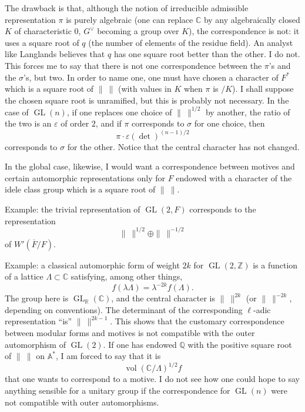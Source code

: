 \documentclass[11pt]{article}
\newcommand{\GL}{\operatorname{GL}}
\newcommand{\vol}{\operatorname{vol}}
\newcommand{\Fbar}{\overline F}
\newcommand{\normchar}{\|\ \|}
\begin{document}
The drawback is that, although the notion of irreducible admissible representation \(\pi\) is purely algebraic (one can replace \(\mathbb C\) by any algebraically closed \(K\) of characteristic \(0\), \(G^\vee\) becoming a group over \(K\)), the correspondence is not: it uses a square root of \(q\) (the number of elements of the residue field). An analyst like Langlands believes that \(q\) has one square root better than the other. I do not. This forces me to say that there is not one correspondence between the \(\pi\)'s and the \(\sigma\)'s, but two. In order to name one, one must have chosen a character of \(F^\ast\) which is a square root of \(\normchar\) (with values in \(K\) when \(\pi\) is \(/K\)). I shall suppose the chosen square root is unramified, but this is probably not necessary. In the case of \(\GL(n)\), if one replaces one choice of \(\normchar^{1/2}\) by another, the ratio of the two is an \(\varepsilon\) of order \(2\), and if \(\pi\) corresponds to \(\sigma\) for one choice, then
\[
\pi\cdot\varepsilon(\det)^{(n-1)/2}
\]
corresponds to \(\sigma\) for the other. Notice that the central character has not changed.

In the global case, likewise, I would want a correspondence between motives and certain automorphic representations only for \(F\) endowed with a character of the idele class group which is a square root of \(\normchar\).

Example: the trivial representation of \(\GL(2,F)\) corresponds to the representation
\[
\normchar^{1/2}\oplus\normchar^{-1/2}
\]
of \(W'(\Fbar/F)\).

Example: a classical automorphic form of weight \(2k\) for \(\GL(2,\mathbb Z)\) is a function of a lattice \(\Lambda\subset\mathbb C\) satisfying, among other things,
\[
f(\lambda\Lambda)=\lambda^{-2k}f(\Lambda).
\]
The group here is \(\GL_{\mathbb R}(\mathbb C)\), and the central character is \(\normchar^{2k}\) (or \(\normchar^{-2k}\), depending on conventions). The determinant of the corresponding \(\ell\)-adic representation ``is'' \(\normchar^{2k-1}\). This shows that the customary correspondence between modular forms and motives is not compatible with the outer automorphism of \(\GL(2)\). If one has endowed \(\mathbb Q\) with the positive square root of \(\normchar\) on \(\mathbb A^\ast\), I am forced to say that it is
\[
\vol(\mathbb C/\Lambda)^{1/2}f
\]
that one wants to correspond to a motive. I do not see how one could hope to say anything sensible for a unitary group if the correspondence for \(\GL(n)\) were not compatible with outer automorphisms.
\end{document}
